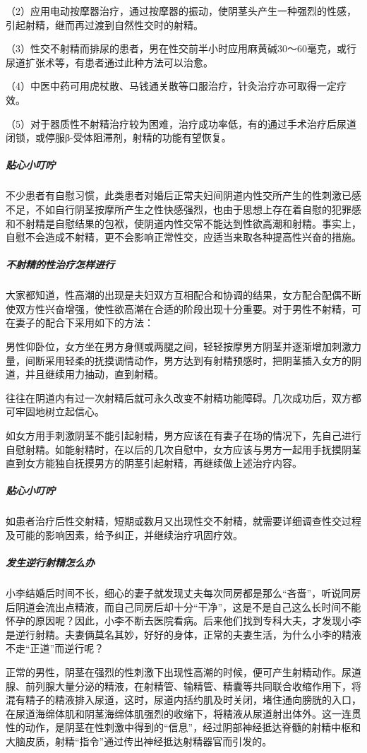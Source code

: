 （2）应用电动按摩器治疗，通过按摩器的振动，使阴茎头产生一种强烈的性感，引起射精，继而再过渡到自然性交时的射精。

（3）性交不射精而排尿的患者，男在性交前半小时应用麻黄碱30～60毫克，或行尿道扩张术等，有患者通过此种方法可以治愈。

（4）中医中药可用虎杖散、马钱通关散等口服治疗，针灸治疗亦可取得一定疗效。

（5）对于器质性不射精治疗较为困难，治疗成功率低，有的通过手术治疗后尿道闭锁，或停服β-受体阻滞剂，射精的功能有望恢复。

\subparagraph{贴心小叮咛}

不少患者有自慰习惯，此类患者对婚后正常夫妇间阴道内性交所产生的性刺激已感不足，不如自行阴茎按摩所产生之性快感强烈，也由于思想上存在着自慰的犯罪感和不射精是自慰结果的包袱，使阴道内性交常不能达到性欲高潮和射精。事实上，自慰不会造成不射精，更不会影响正常性交，应适当来取各种提高性兴奋的措施。

\subparagraph{不射精的性治疗怎样进行}

大家都知道，性高潮的出现是夫妇双方互相配合和协调的结果，女方配合配偶不断使双方性兴奋增强，使性欲高潮在合适的阶段出现十分重要。对于男性不射精，可在妻子的配合下采用如下的方法：

男性仰卧位，女方坐在男方身侧或两腿之间，轻轻按摩男方阴茎并逐渐增加刺激力量，间断采用轻柔的抚摸调情动作，男方达到有射精预感时，把阴茎插入女方的阴道，并且继续用力抽动，直到射精。

往往在阴道内有过一次射精后就可永久改变不射精功能障碍。几次成功后，双方都可牢固地树立起信心。

如女方用手刺激阴茎不能引起射精，男方应该在有妻子在场的情况下，先自己进行自慰射精。如能射精时，在以后的几次自慰中，女方应该与男方一起用手抚摸阴茎直到女方能独自抚摸男方的阴茎引起射精，再继续做上述治疗内容。

\subparagraph{贴心小叮咛}

如患者治疗后性交射精，短期或数月又出现性交不射精，就需要详细调查性交过程及可能的影响因素，给予纠正，并继续治疗巩固疗效。

\subparagraph{发生逆行射精怎么办}

小李结婚后时间不长，细心的妻子就发现丈夫每次同房都是那么“吝啬”，听说同房后阴道会流出点精液，而自己同房后却十分“干净”，这是不是自己这么长时间不能怀孕的原因呢？因此，小李不断去医院看病。后来他们找到专科大夫，才发现小李是逆行射精。夫妻俩莫名其妙，好好的身体，正常的夫妻生活，为什么小李的精液不走“正道”而逆行呢？

正常的男性，阴茎在强烈的性刺激下出现性高潮的时候，便可产生射精动作。尿道腺、前列腺大量分泌的精液，在射精管、输精管、精囊等共同联合收缩作用下，将混有精子的精液排入尿道，这时，尿道内括约肌及时关闭，堵住通向膀胱的入口，在尿道海绵体肌和阴茎海绵体肌强烈的收缩下，将精液从尿道射出体外。这一连贯性的动作，是阴茎在性刺激中得到的“信息”，经过阴部神经抵达脊髓的射精中枢和大脑皮质，射精“指令”通过传出神经抵达射精器官而引发的。

